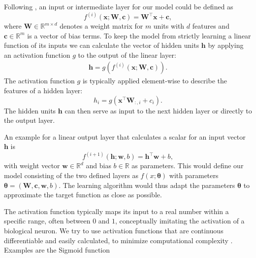 Following \cite{Goodfellow-et-al-2016}, an input or intermediate layer for our model could be defined as
\begin{equation}
    f^{(i)}(\mathbf{x}; \mathbf{W},\mathbf{c})=\mathbf{W}^\top\mathbf{x}+\mathbf{c},
\end{equation}
where $\mathbf{W} \in \mathbb{R}^{m\times d}$ denotes a weight matrix for $m$ units with $d$ features and $\mathbf{c}\in \mathbb{R}^m$ is a vector of bias terms.
To keep the model from strictly learning a linear function of its inputs we can calculate the vector of hidden units $\mathbf{h}$ by applying an activation function $g$ to the output of the linear layer:
\begin{align}
    \mathbf{h} = g(f^{(i)}(\mathbf{x}; \mathbf{W},\mathbf{c})).
\end{align}
The activation function $g$ is typically applied element-wise to describe the features of a hidden layer:
\begin{equation}
    h_i = g(\mathbf{x}^\top\mathbf{W}_{:,i}+c_i).
\end{equation}
The hidden units $\mathbf{h}$ can then serve as input to the next hidden layer or directly to the output layer.

An example for a linear output layer that calculates a scalar for an input vector $\mathbf{h}$ is
\begin{equation}
    f^{(i+1)}(\mathbf{h}; \mathbf{w},b)=\mathbf{h}^\top\mathbf{w}+b,
\end{equation}
with weight vector $\mathbf{w} \in \mathbb{R}^d$ and bias $b \in \mathbb{R}$ as parameters. This would define our model consisting of the two defined layers as $f(x;\boldsymbol{\theta})$ with parameters $\boldsymbol{\theta} = (\mathbf{W}, \mathbf{c}, \mathbf{w}, b)$. The learning algorithm would thus adapt the parameters $\boldsymbol{\theta}$ to approximate the target function as close as possible.

The activation function typically maps its input to a real number within a specific range, often between $0$ and $1$, conceptually imitating the activation of a biological neuron. We try to use activation functions that are continuous differentiable and easily calculated, to minimize computational complexity \cite{Liu2020}. Examples are the Sigmoid function

